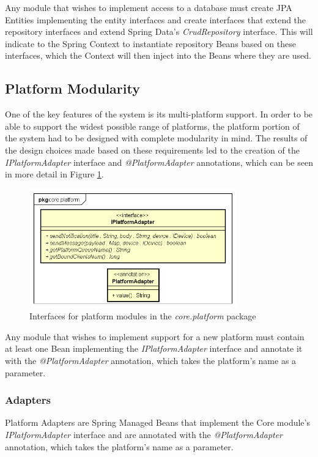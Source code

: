 Any module that wishes to implement access to a database must create JPA Entities implementing the entity interfaces and create interfaces that extend the repository interfaces and extend Spring Data's \textit{CrudRepository} interface. This will indicate to the Spring Context to instantiate repository Beans based on these interfaces\cite{spring-repos}, which the Context will then inject into the Beans where they are used.

\subsection{Platform Modularity} \label{design:platform-modularity}
One of the key features of the system is its multi-platform support. In order to be able to support the widest possible range of platforms, the platform portion of the system had to be designed with complete modularity in mind. The results of the design choices made based on these requirements led to the creation of the \textit{IPlatformAdapter} interface and \textit{@PlatformAdapter} annotations, which can be seen in more detail in Figure \ref{fig:core-platform-module}.

\begin{figure}[!htb]
	\centering
	\includegraphics[width=0.8\textwidth]{figures/03_design/core-platform-module}
    \caption{Interfaces for platform modules in the \textit{core.platform} package}
    \label{fig:core-platform-module}
\end{figure}

Any module that wishes to implement support for a new platform must contain at least one Bean implementing the \textit{IPlatformAdapter} interface and annotate it with the \textit{@PlatformAdapter} annotation, which takes the platform's name as a parameter.

\subsubsection{Adapters}\label{sec:adapters}
Platform Adapters are Spring Managed Beans that implement the Core module's \textit{IPlatformAdapter} interface and are annotated with the \textit{@PlatformAdapter} annotation, which takes the platform's name as a parameter. 

